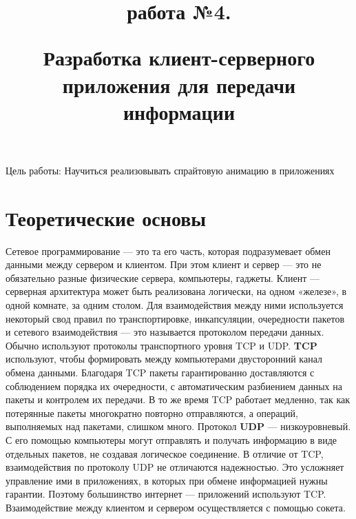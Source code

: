 \documentclass[a4paper]{article}
\title{\bfseriesЛабораторная работа №4.\newline

Разработка клиент-серверного приложения для передачи информации}
\date{}
\begin{document}
\maketitle
\newpage

Цель работы: Научиться реализовывать спрайтовую анимацию в приложениях

\section{Теоретические основы}

Сетевое программирование --- это та его часть, которая подразумевает обмен данными между сервером и клиентом. При этом клиент и сервер --- это не обязательно разные физические сервера, компьютеры, гаджеты. Клиент --- серверная архитектура может быть реализована логически, на одном «железе», в одной комнате, за одним столом. Для взаимодействия между ними используется некоторый свод правил по транспортировке, инкапсуляции, очередности пакетов и сетевого взаимодействия --- это называется протоколом передачи данных. Обычно используют протоколы транспортного уровня TCP и UDP. \textbf{TCP} используют, чтобы формировать между компьютерами двусторонний канал обмена данными. Благодаря TCP пакеты гарантированно доставляются с соблюдением порядка их очередности, с автоматическим разбиением данных на пакеты и контролем их передачи. В то же время TCP работает медленно, так как потерянные пакеты многократно повторно отправляются, а операций, выполняемых над пакетами, слишком много. Протокол \textbf{UDP} --- низкоуровневый. С его помощью компьютеры могут отправлять и получать информацию в виде отдельных пакетов, не создавая логическое соединение. В отличие от TCP, взаимодействия по протоколу UDP не отличаются надежностью. Это усложняет управление ими в приложениях, в которых при обмене информацией нужны гарантии. Поэтому большинство интернет --- приложений используют TCP. Взаимодействие между клиентом и сервером осуществляется с помощью сокета.

\begin{figure}[h]
\end{figure}
\end{document}
